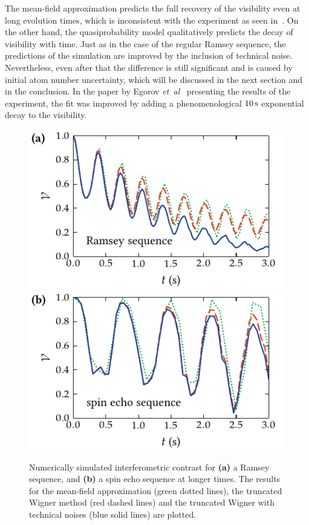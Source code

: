 The mean-field approximation predicts the full recovery of the visibility even at long evolution times, which is inconsistent with the experiment as seen in~.
On the other hand, the quasiprobability model qualitatively predicts the decay of visibility with time.
Just as in the case of the regular Ramsey sequence, the predictions of the simulation are improved by the inclusion of technical noise.
Nevertheless, even after that the difference is still significant and is caused by initial atom number uncertainty, which will be discussed in the next section and in the conclusion.
In the paper by Egorov \textit{et~al}~\cite{Egorov2011} presenting the results of the experiment, the fit was improved by adding a phenomenological $10\mbox{\ensuremath{\,\mathrm{s}}}$ exponential decay to the visibility.

\begin{figure}
    \centerline{%
    \includegraphics{figures_generated/bec_noise/ramsey_visibility_long.pdf}%
    \includegraphics{figures_generated/bec_noise/echo_visibility_long.pdf}}

    \caption[Experimental and numerically simulated interferometric constrast in Ramsey and spin echo sequences for longer times]{
    Numerically simulated interferometric contrast for \textbf{(a)} a Ramsey sequence, and \textbf{(b)} a spin echo sequence at longer times.
    The results for the mean-field approximation (green dotted lines), the truncated Wigner method (red dashed lines) and the truncated Wigner with technical noises (blue solid lines) are plotted.}%

    \label{fig:bec-noise:visibility:visibility-long}
\end{figure}

